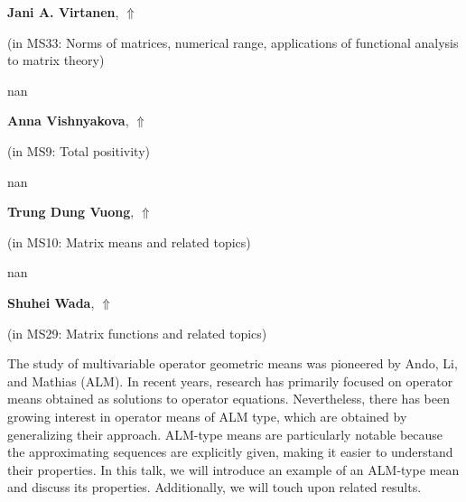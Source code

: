 \documentclass[ILAS2025-program.tex]{subfiles}
\begin{document}
     \hypertarget{down0246}{}\begin{ilasabstract}
    
    \textbf{Jani A. Virtanen},  \hfill \hyperlink{up0246}{$\Uparrow$}
    
    (in {\color{mstitle}MS33: Norms of matrices, numerical range, applications of functional analysis to matrix theory})
        
        \mtskip
    nan\end{ilasabstract}
     \hypertarget{down0045}{}\begin{ilasabstract}
    
    \textbf{Anna Vishnyakova},  \hfill \hyperlink{up0045}{$\Uparrow$}
    
    (in {\color{mstitle}MS9: Total positivity})
        
        \mtskip
    nan\end{ilasabstract}
     \hypertarget{down0134}{}\begin{ilasabstract}
    
    \textbf{Trung Dung Vuong},  \hfill \hyperlink{up0134}{$\Uparrow$}
    
    (in {\color{mstitle}MS10: Matrix means and related topics})
        
        \mtskip
    nan\end{ilasabstract}
     \hypertarget{down0124}{}\begin{ilasabstract}
    
    \textbf{Shuhei Wada},  \hfill \hyperlink{up0124}{$\Uparrow$}
    
    (in {\color{mstitle}MS29: Matrix functions and related topics})
        
        \mtskip
    The study of multivariable operator geometric means was pioneered by Ando, Li, and Mathias (ALM). In recent years, research has primarily focused on operator means obtained as solutions to operator equations. Nevertheless, there has been growing interest in operator means of ALM type, which are obtained by generalizing their approach. ALM-type means are particularly notable because the approximating sequences are explicitly given, making it easier to understand their properties. In this talk, we will introduce an example of an ALM-type mean and discuss its properties. Additionally, we will touch upon related results.
\end{ilasabstract}
\end{document}
